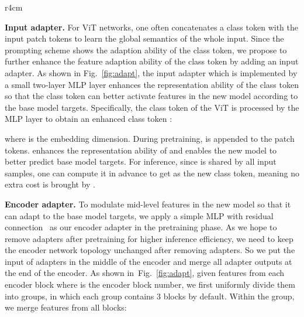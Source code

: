 \documentclass{article} \usepackage{iclr2023_conference,times}
\def\figref#1{figure~\ref{#1}}
\def\secref#1{section~\ref{#1}}
\newcommand{\myPara}[1]{\vspace{-.05in} \noindent\textbf{#1}}
\renewcommand{\figref}[1]{Fig.~\ref{#1}}\newcommand{\tabref}[1]{Tab.~\ref{#1}}\renewcommand{\secref}[1]{Section~\ref{#1}}
\begin{document}
\begin{wrapfigure}{r}{4cm}
	\centering
	\vspace{-13pt}
	\setlength{\tabcolsep}{3.8pt} \renewcommand{\arraystretch}{3.7}{ \fontsize{8.3}{1}}
	\vspace{-21pt}
	\caption{The input adapter and encoder adapter.}
	\vspace{-10pt}
	\label{fig:adapt}
\end{wrapfigure}
	\myPara{Input adapter.} 
For ViT networks, one often concatenates a class token  with the input patch tokens to learn the global semantics of the whole input. 
Since the prompting scheme shows the adaption ability of the class token, 
we propose to further enhance the feature adaption ability of the class token by adding an input adapter.  
As shown in \figref{fig:adapt},  the input adapter which is implemented by a small two-layer MLP layer enhances 
the representation ability of the class token 	so that the class token can better activate features in the new model 		according to the base model targets.
Specifically, the class token  of the ViT is processed by the MLP layer to obtain an enhanced class token :
 
where  is the embedding dimension. 
During pretraining,  is appended to the patch tokens.
 enhances the representation ability of  and enables the new model to better predict base model targets. 
For inference, since  is shared by all input samples, 
one can compute it in advance to get  as the new class token, 
meaning no extra cost is brought by .

 
\myPara{Encoder adapter.}
To modulate mid-level features in the new model so that it can adapt to the base model targets, we apply a simple MLP with residual connection~\citep{chen2022adaptformer} as our encoder adapter in the  pretraining phase. 
As we hope to remove adapters after pretraining for higher inference efficiency,
we need to keep the encoder network topology unchanged after removing adapters. 
So we put the input of adapters in the middle of the encoder and merge all adapter outputs at the end of the encoder. 
As shown in~\figref{fig:adapt}, given features  from each encoder block where  is the encoder block number, we first uniformly divide them into  groups, in which  each group contains 3 blocks by default. 
Within the  group, we merge features from all blocks: 
\end{document}
